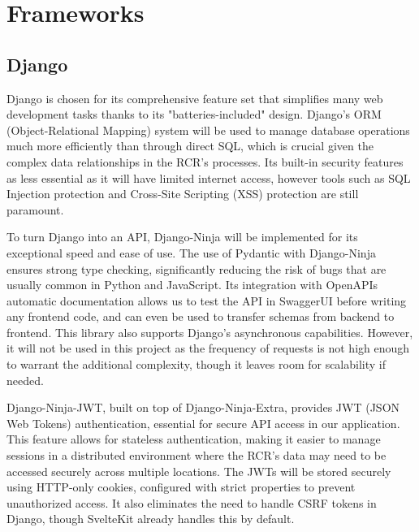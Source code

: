 \section{Frameworks}
\subsection{Django} \label{Django}
Django is chosen for its comprehensive feature set that simplifies many web development tasks thanks to its "batteries-included" design. Django’s ORM (Object-Relational Mapping) system will be used to manage database operations much more efficiently than through direct SQL, which is crucial given the complex data relationships in the RCR’s processes. Its built-in security features as less essential as it will have limited internet access, however tools such as SQL Injection protection and Cross-Site Scripting (XSS) protection are still paramount.

To turn Django into an API, Django-Ninja will be implemented for its exceptional speed and ease of use. The use of Pydantic with Django-Ninja ensures strong type checking, significantly reducing the risk of bugs that are usually common in Python and JavaScript. Its integration with OpenAPIs automatic documentation allows us to test the API in SwaggerUI before writing any frontend code, and can even be used to transfer schemas from backend to frontend. This library also supports Django's asynchronous capabilities. However, it will not be used in this project as the frequency of requests is not high enough to warrant the additional complexity, though it leaves room for scalability if needed.

Django-Ninja-JWT, built on top of Django-Ninja-Extra, provides JWT (JSON Web Tokens) authentication, essential for secure API access in our application. This feature allows for stateless authentication, making it easier to manage sessions in a distributed environment where the RCR's data may need to be accessed securely across multiple locations. The JWTs will be stored securely using HTTP-only cookies, configured with strict properties to prevent unauthorized access. It also eliminates the need to handle CSRF tokens in Django, though SvelteKit already handles this by default.

